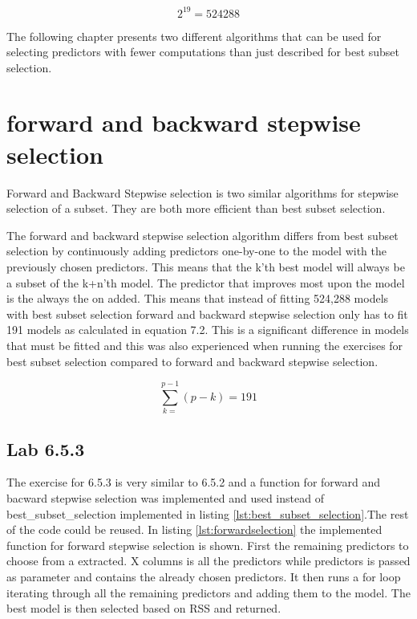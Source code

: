 \begin{equation}
2^{19} = 524288
\end{equation}

The following chapter presents two different algorithms that can be used for selecting predictors with fewer computations than just described for best subset selection.

\section{forward and backward stepwise selection}
Forward and Backward Stepwise selection is two similar algorithms for stepwise selection of a subset. They are both more efficient than best subset selection.

The forward and backward stepwise selection algorithm differs from best subset selection by continuously adding predictors one-by-one to the model with the previously chosen predictors. This means that the k'th best model will always be a subset of the k+n'th model. The predictor that improves most upon the model is the always the on added. This means that instead of fitting 524,288 models with best subset selection forward and backward stepwise selection only has to fit 191 models as calculated in equation 7.2. This is a significant difference in models that must be fitted and this was also experienced when running the exercises for best subset selection compared to forward and backward stepwise selection.

\begin{equation}
\sum_{k=}^{p-1}(p-k) = 191
\end{equation}

\subsection{Lab 6.5.3}
The exercise for 6.5.3 is very similar to 6.5.2 and a function for forward and bacward stepwise selection was implemented and used instead of best\_subset\_selection implemented in listing \ref{lst:best_subset_selection}.The rest of the code could be reused. In listing \ref{lst:forwardselection} the implemented function for forward stepwise selection is shown. First the remaining predictors to choose from a extracted. X columns is all the predictors while predictors is passed as parameter and contains the already chosen predictors. It then runs a for loop iterating through all the remaining predictors and adding them to the model. The best model is then selected based on RSS and returned.

